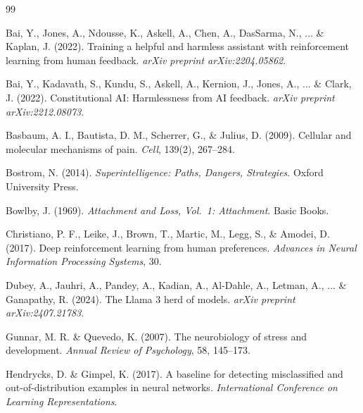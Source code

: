 \documentclass[10pt,letterpaper]{article}
\begin{document}
\begin{thebibliography}{99}

Bai, Y., Jones, A., Ndousse, K., Askell, A., Chen, A., DasSarma, N., ... \& Kaplan, J. (2022).
\newblock Training a helpful and harmless assistant with reinforcement learning from human feedback.
\newblock \textit{arXiv preprint arXiv:2204.05862}.

Bai, Y., Kadavath, S., Kundu, S., Askell, A., Kernion, J., Jones, A., ... \& Clark, J. (2022).
\newblock Constitutional AI: Harmlessness from AI feedback.
\newblock \textit{arXiv preprint arXiv:2212.08073}.

Basbaum, A. I., Bautista, D. M., Scherrer, G., \& Julius, D. (2009).
\newblock Cellular and molecular mechanisms of pain.
\newblock \textit{Cell}, 139(2), 267--284.

Bostrom, N. (2014).
\newblock \textit{Superintelligence: Paths, Dangers, Strategies}.
\newblock Oxford University Press.

Bowlby, J. (1969).
\newblock \textit{Attachment and Loss, Vol.~1: Attachment}.
\newblock Basic Books.

Christiano, P. F., Leike, J., Brown, T., Martic, M., Legg, S., \& Amodei, D. (2017).
\newblock Deep reinforcement learning from human preferences.
\newblock \textit{Advances in Neural Information Processing Systems}, 30.

Dubey, A., Jauhri, A., Pandey, A., Kadian, A., Al-Dahle, A., Letman, A., ... \& Ganapathy, R. (2024).
\newblock The Llama 3 herd of models.
\newblock \textit{arXiv preprint arXiv:2407.21783}.

Gunnar, M. R. \& Quevedo, K. (2007).
\newblock The neurobiology of stress and development.
\newblock \textit{Annual Review of Psychology}, 58, 145--173.

Hendrycks, D. \& Gimpel, K. (2017).
\newblock A baseline for detecting misclassified and out-of-distribution examples in neural networks.
\newblock \textit{International Conference on Learning Representations}.


\end{thebibliography}
\end{document}
